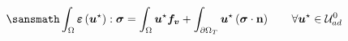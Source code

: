 \documentclass[preview]{standalone}
\begin{document}
$ \displaystyle \sansmath
\int_{\Omega} \boldsymbol{\varepsilon}\left(\boldsymbol{u}^{\star}\right) : \boldsymbol{\sigma} = \int_{\Omega} \boldsymbol{u}^{\star} \boldsymbol{f_{v}} + \int_{\partial\Omega_T} \boldsymbol{u}^{\star} \left( \boldsymbol{\sigma}\cdot \mathbf{n} \right) \;\;\;\;\;\;\; \forall \boldsymbol{u}^{\star}\in \mathcal{U}_{ad}^{0}
$
\end{document}
